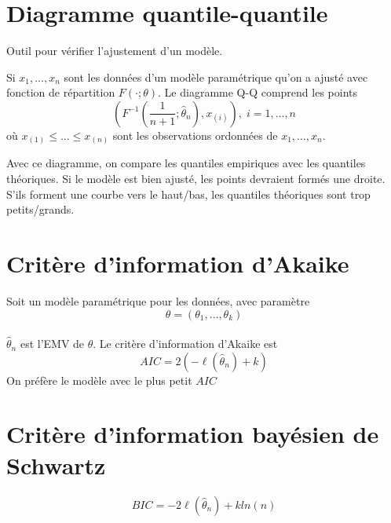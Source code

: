 \section{Diagramme quantile-quantile}\label{diagramme-quantile-quantile}

Outil pour vérifier l'ajustement d'un modèle.

Si \(x_1,\dots,x_n\) sont les données d'un modèle paramétrique qu'on a
ajusté avec fonction de répartition \(F(\cdot;\theta)\). Le diagramme
Q-Q comprend les points \[
\left (F^{-1}\left(\dfrac{1}{n+1};\hat{\theta}_n\right),x_{(i)}\right ),\;i=1,\dots,n
\] où \(x_{(1)} \leq \dots \leq x_{(n)}\) sont les observations
ordonnées de \(x_1,\dots,x_n\).

Avec ce diagramme, on compare les quantiles empiriques avec les
quantiles théoriques. Si le modèle est bien ajusté, les points devraient
formés une droite. S'ils forment une courbe vers le haut/bas, les
quantiles théoriques sont trop petits/grands.

\section{Critère d'information d'Akaike}\label{critere-dinformation-dakaike}

Soit un modèle paramétrique pour les données, avec paramètre \[
\theta=(\theta_1,\dots,\theta_k) 
\]\\
\(\hat{\theta}_n\) est l'EMV de \(\theta\). Le critère d'information
d'Akaike est \[
AIC = 2(-\ell(\hat{\theta}_n)+k)
\] On préfère le modèle avec le plus petit \(AIC\)

\section{Critère d'information bayésien de Schwartz}\label{critere-dinformation-bayesien-de-schwartz}

\[
BIC = -2\ell(\hat{\theta}_n)+k ln(n)
\]
